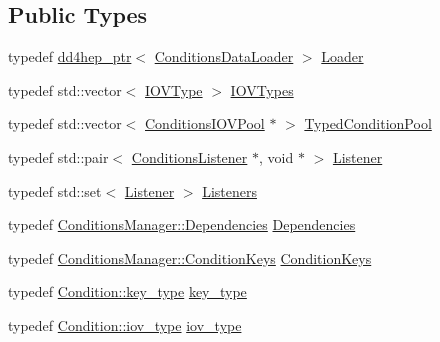 \subsection*{Public Types}
\begin{DoxyCompactItemize}
\item 
typedef \hyperlink{class_d_d4hep_1_1dd4hep__ptr}{dd4hep\+\_\+ptr}$<$ \hyperlink{class_d_d4hep_1_1_conditions_1_1_conditions_data_loader}{Conditions\+Data\+Loader} $>$ \hyperlink{class_d_d4hep_1_1_conditions_1_1_conditions_manager_object_ab2df3fc6386b7f71ed3087271d90acc6}{Loader}
\item 
typedef std\+::vector$<$ \hyperlink{class_d_d4hep_1_1_i_o_v_type}{I\+O\+V\+Type} $>$ \hyperlink{class_d_d4hep_1_1_conditions_1_1_conditions_manager_object_a8c3b7d5bdfb7fc6bf6e61ddba5a5f652}{I\+O\+V\+Types}
\item 
typedef std\+::vector$<$ \hyperlink{class_d_d4hep_1_1_conditions_1_1_conditions_i_o_v_pool}{Conditions\+I\+O\+V\+Pool} $\ast$ $>$ \hyperlink{class_d_d4hep_1_1_conditions_1_1_conditions_manager_object_a1617c134372fbb79d06990707f19bb0c}{Typed\+Condition\+Pool}
\item 
typedef std\+::pair$<$ \hyperlink{class_d_d4hep_1_1_conditions_1_1_conditions_listener}{Conditions\+Listener} $\ast$, void $\ast$ $>$ \hyperlink{class_d_d4hep_1_1_conditions_1_1_conditions_manager_object_ac4cd1e3a448bc1f8bae384d194f10c23}{Listener}
\item 
typedef std\+::set$<$ \hyperlink{class_d_d4hep_1_1_conditions_1_1_conditions_manager_object_ac4cd1e3a448bc1f8bae384d194f10c23}{Listener} $>$ \hyperlink{class_d_d4hep_1_1_conditions_1_1_conditions_manager_object_aba0162524bc90a39e30bd5f1f0067ee2}{Listeners}
\item 
typedef \hyperlink{class_d_d4hep_1_1_conditions_1_1_conditions_manager_aab778cfbe096ae8ad20a0bdbb047ad32}{Conditions\+Manager\+::\+Dependencies} \hyperlink{class_d_d4hep_1_1_conditions_1_1_conditions_manager_object_a539905074db3aee8b401d575649dbdd8}{Dependencies}
\item 
typedef \hyperlink{class_d_d4hep_1_1_conditions_1_1_conditions_manager_a8dd76f9acef2c8d3b7970e266fe7eff6}{Conditions\+Manager\+::\+Condition\+Keys} \hyperlink{class_d_d4hep_1_1_conditions_1_1_conditions_manager_object_aad75140018040c6ad49e56a4d56a35ee}{Condition\+Keys}
\item 
typedef \hyperlink{class_d_d4hep_1_1_conditions_1_1_condition_a7528efa762e8cc072ef80ea67c3531f9}{Condition\+::key\+\_\+type} \hyperlink{class_d_d4hep_1_1_conditions_1_1_conditions_manager_object_ac44eafc69174743e81d2f60e1f510719}{key\+\_\+type}
\item 
typedef \hyperlink{class_d_d4hep_1_1_conditions_1_1_condition_ad84300e226b2085ec5e9db7f47be5539}{Condition\+::iov\+\_\+type} \hyperlink{class_d_d4hep_1_1_conditions_1_1_conditions_manager_object_a0190ec510ca46da4a1cc908ac3c3a1dd}{iov\+\_\+type}
\end{DoxyCompactItemize}
